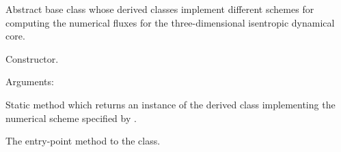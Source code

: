 \documentclass[letterpaper,10pt,english]{sphinxmanual}
\begin{document}
\begin{fulllineitems}
\label{\detokenize{api:dycore.isentropic_flux.IsentropicFlux}}
Abstract base class whose derived classes implement different schemes for computing the numerical fluxes for
the three-dimensional isentropic dynamical core.

\begin{fulllineitems}
\label{\detokenize{api:dycore.isentropic_flux.IsentropicFlux.__init__}}
Constructor.

Arguments:

\end{fulllineitems}


\begin{fulllineitems}
\label{\detokenize{api:dycore.isentropic_flux.IsentropicFlux.factory}}
Static method which returns an instance of the derived class implementing the numerical scheme
specified by .

\end{fulllineitems}


\begin{fulllineitems}
\label{\detokenize{api:dycore.isentropic_flux.IsentropicFlux.get_fluxes}}
The entry-point method to the class.

\end{fulllineitems}


\end{fulllineitems}

\end{document}
